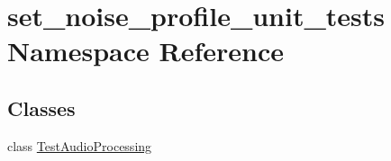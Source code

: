 \hypertarget{namespaceset__noise__profile__unit__tests}{\section{set\-\_\-noise\-\_\-profile\-\_\-unit\-\_\-tests Namespace Reference}
\label{namespaceset__noise__profile__unit__tests}
}
\subsection*{Classes}
\begin{DoxyCompactItemize}
\item 
class \hyperlink{classset__noise__profile__unit__tests_1_1TestAudioProcessing}{Test\-Audio\-Processing}
\end{DoxyCompactItemize}
